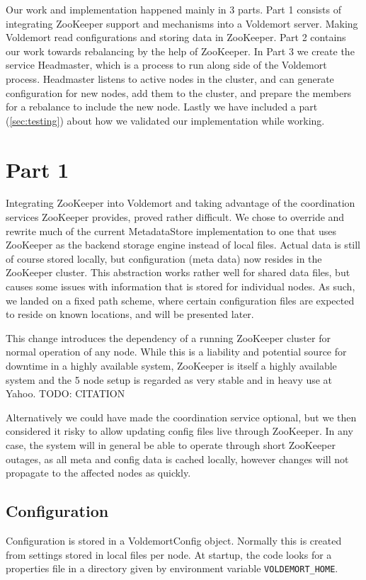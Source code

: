 
Our work and implementation happened mainly in 3 parts. Part 1 consists of integrating ZooKeeper support and mechanisms into a Voldemort server. Making Voldemort read configurations and storing data in ZooKeeper. Part 2 contains our work towards rebalancing by the help of ZooKeeper. In Part 3 we create the service Headmaster, which is a process to run along side of the Voldemort process. Headmaster listens to active nodes in the cluster, and can generate configuration for new nodes, add them to the cluster, and prepare the members for a rebalance to include the new node. Lastly we have included a part (\ref{sec:testing}) about how we validated our implementation while working.


\section{Part 1}
Integrating ZooKeeper into Voldemort and taking advantage of the coordination services ZooKeeper provides, proved rather difficult.
We chose to override and rewrite much of the current MetadataStore implementation to one that uses ZooKeeper as the backend storage engine instead of local files. 
Actual data is still of course stored locally, but configuration (meta data) now resides in the ZooKeeper cluster.
This abstraction works rather well for shared data files, but causes some issues with information that is stored for individual nodes. 
As such, we landed on a fixed path scheme, where certain configuration files are expected to reside on known locations, and will be presented later.

This change introduces the dependency of a running ZooKeeper cluster for normal operation of any node. While this is a liability and potential source for downtime in a highly available system, ZooKeeper is itself a highly available system and the 5 node setup is regarded as very stable and in heavy use at Yahoo\cite{need:citation}.
TODO: CITATION

Alternatively we could have made the coordination service optional, but we then considered it risky to allow updating config files live through ZooKeeper. In any case, the system will in general be able to operate through short ZooKeeper outages, as all meta and config data is cached locally, however changes will not propagate to the affected nodes as quickly.

\subsection{Configuration}
Configuration is stored in a VoldemortConfig object. Normally this is created from settings stored in local files per node. At startup, the code looks for a properties file in a directory given by environment variable \texttt{VOLDEMORT\_HOME}. 

